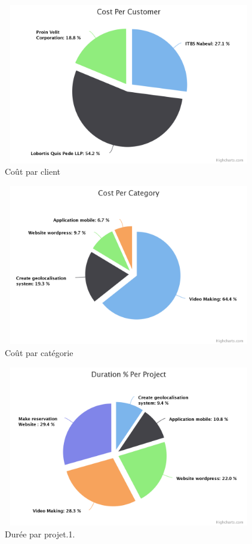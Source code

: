 \FloatBarrier
\begin{figure}[H]
\center
\includegraphics[width=11cm,height=7cm]{./figures/pres/cost-per-customer.png}
\caption{ Co\^{u}t par client }
\end{figure}
\FloatBarrier

\FloatBarrier
\begin{figure}[H]
\center
\includegraphics[width=11cm,height=7cm]{./figures/pres/cost-per-category.png}
\caption{ Co\^{u}t par cat\'{e}gorie}
\end{figure}
\FloatBarrier

\FloatBarrier
\begin{figure}[H]
\center
\includegraphics[width=11cm,height=7cm]{./figures/pres/duration-per-project.png}
\caption{Dur\'{e}e par projet.1. }
\end{figure}
\FloatBarrier

